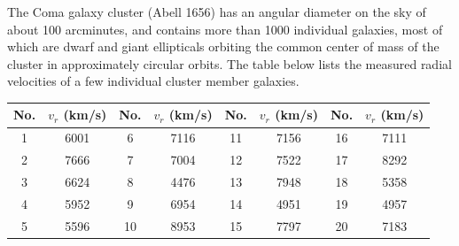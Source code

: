 The Coma galaxy cluster (Abell 1656) has an angular diameter on the sky of
about 100 arcminutes, and contains more than 1000 individual galaxies, most of
which are dwarf and giant ellipticals orbiting the common center of mass of
the cluster in approximately circular orbits. The table below lists the
measured radial velocities of a few individual cluster member galaxies.

\begin{center}
\begin{tabular}{cc|cc|cc|cc}
No. & $v_r$ (km/s) & No. & $v_r$ (km/s) & No. & $v_r$ (km/s) &
No. & $v_r$ (km/s) \\
\hline
1 & 6001 &  6 & 7116 & 11 & 7156 & 16 & 7111 \\
2 & 7666 &  7 & 7004 & 12 & 7522 & 17 & 8292 \\
3 & 6624 &  8 & 4476 & 13 & 7948 & 18 & 5358 \\
4 & 5952 &  9 & 6954 & 14 & 4951 & 19 & 4957 \\
5 & 5596 & 10 & 8953 & 15 & 7797 & 20 & 7183 \\
\end{tabular}
\end{center}

